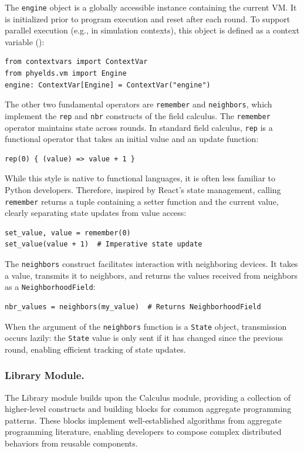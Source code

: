 \documentclass[runningheads]{llncs}
\begin{document}
%
The \texttt{engine} object is a globally accessible instance containing the current VM.
It is initialized prior to program execution and reset after each round.
To support parallel execution (e.g., in simulation contexts),
this object is defined as a context variable ():
\begin{lstlisting}[style=pythonstyle, caption={Engine as a context variable.}, label={lst:engine-global}]
from contextvars import ContextVar
from phyelds.vm import Engine
engine: ContextVar[Engine] = ContextVar("engine")
\end{lstlisting}
The other two fundamental operators are \texttt{remember} and \texttt{neighbors}, which implement the \texttt{rep} and \texttt{nbr} constructs of the field calculus.
%
The \texttt{remember} operator maintains state across rounds.
In standard field calculus, \texttt{rep} is a functional operator that takes an initial value and an update function:
\begin{lstlisting}[style=pythonstyle]
rep(0) { (value) => value + 1 }
\end{lstlisting}
While this style is native to functional languages, it is often less familiar to Python developers. 
Therefore, inspired by React's state management, calling \texttt{remember} returns a tuple containing a setter function and the current value, clearly separating state updates from value access:
\begin{lstlisting}[style=pythonstyle, caption={Using the \texttt{remember} construct.}, label={lst:remember-use}]
set_value, value = remember(0)
set_value(value + 1)  # Imperative state update
\end{lstlisting}
%
The \texttt{neighbors} construct facilitates interaction with neighboring devices.
It takes a value, transmits it to neighbors, and returns the values received from neighbors as a \texttt{NeighborhoodField}:
\begin{lstlisting}[style=pythonstyle, caption={Using the \texttt{neighbors} construct.}, label={lst:neighbor-use}]
nbr_values = neighbors(my_value)  # Returns NeighborhoodField
\end{lstlisting}
When the argument of the \texttt{neighbors} function is a \texttt{State} object, transmission occurs lazily:
the \texttt{State} value is only sent if it has changed since the previous round,
enabling efficient tracking of state updates.
\subsubsection{Library Module.}\label{sec:library-module}
The Library module builds upon the Calculus module,
providing a collection of higher-level constructs and building blocks for common aggregate programming patterns.
These blocks implement well-established algorithms from aggregate programming literature,
enabling developers to compose complex distributed behaviors from reusable components.
\end{document}
